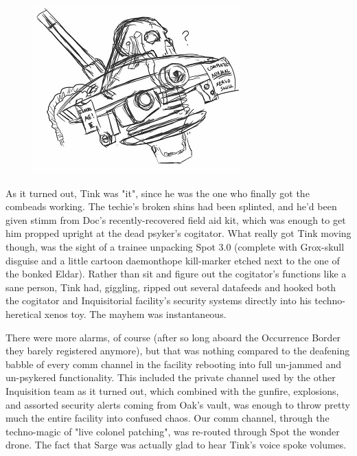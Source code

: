 \begin{figure}
	\begin{center}
		\includegraphics[width=\figwidth]{pics/21/99.png}
	\end{center}
\end{figure}
As it turned out, Tink was "it", since he was the one who finally got the combeads working. 
The techie's broken shins had been splinted, and he'd been given stimm from Doc's recently-recovered field aid kit, which was enough to get him propped upright at the dead psyker's cogitator. 
 What really got Tink moving though, was the sight of a trainee unpacking Spot 3.0 (complete with Grox-skull disguise and a little cartoon daemonthope kill-marker etched next to the one of the bonked Eldar). 
Rather than sit and figure out the cogitator's functions like a sane person, Tink had, giggling, ripped out several datafeeds and hooked both the cogitator and Inquisitorial facility's security systems directly into his techno-heretical xenos toy. 
The mayhem was instantaneous.

There were more alarms, of course (after so long aboard the Occurrence Border they barely registered anymore), but that was nothing compared to the deafening babble of every comm channel in the facility rebooting into full un-jammed and un-psykered functionality. 
This included the private channel used by the other Inquisition team as it turned out, which combined with the gunfire, explosions, and assorted security alerts coming from Oak's vault, was enough to throw pretty much the entire facility into confused chaos. 
Our comm channel, through the techno-magic of "live colonel patching", was re-routed through Spot the wonder drone. 
The fact that Sarge was actually glad to hear Tink's voice spoke volumes.


